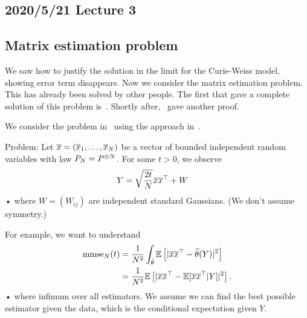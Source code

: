 \subsection*{2020/5/21 Lecture 3}

\subsection{Matrix estimation problem}

We saw how to justify the solution in the limit for the Curie-Weiss model, showing error term disappears. Now we consider the matrix estimation problem. This has already been solved by other people. The first that gave a complete solution of this problem is~\cite{lelarge2019fundamental}. Shortly after,~\cite{barbier2019adaptive} gave another proof. 

We consider the problem in~\cite{mourrat2018hamilton} using the approach in~\cite{mourrat2019hamilton}.


Problem: Let $\overline{x} = (\overline{x}_1,\ldots, \overline{x}_N)$ be a vector of bounded independent random variables with law $P_N=P^{\otimes N}$. For some $t>0$, we observe
\begin{align*}
Y &= \sqrt{\frac{2t}{N}} \overline{x} \overline{x}^\top +W
\end{align*}•
where $W=(W_{ij})$ are independent standard Gaussians. (We don't assume symmetry.)


For example, we want to understand
\begin{align*}
\text{mmse}_N(t) &= \frac{1}{N^2}  \int_{\widehat{\theta}} \mathbb{E}\left[ {|\overline{x} \overline{x}^\top - \widehat{\theta} (Y)|^2} \right]\\
& = \frac{1}{N^2} \mathbb{E} \left[ {|\overline{x}\overline{x}^\top - \mathbb{E}[\overline{x}\overline{x}^\top |Y]|^2} \right].
\end{align*}•
where infimum over all estimators. We assume we can find the best possible estimator given the data, which is the conditional expectation given $Y$.

